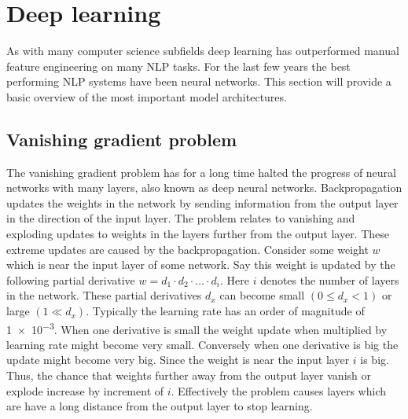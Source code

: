 \section{Deep learning}
\label{sec:deep_learning}

As with many computer science subfields deep learning has outperformed manual feature engineering on many NLP tasks.
For the last few years the best performing NLP systems have been neural networks.
This section will provide a basic overview of the most important model architectures.

\subsection{Vanishing gradient problem}
\label{subsec:vanishing_gradient_problem}
The vanishing gradient problem has for a long time halted the progress of neural networks with many layers, also known as deep neural networks.
Backpropagation updates the weights in the network by sending information from the output layer in the direction of the input layer.
The problem relates to vanishing and exploding updates to weights in the layers further from the output layer.
These extreme updates are caused by the backpropagation.
Consider some weight $w$ which is near the input layer of some network.
Say this weight is updated by the following partial derivative $w = d_1 \cdot d_2 \cdot \ldots \cdot d_i$.
Here $i$ denotes the number of layers in the network.
These partial derivatives $d_x$ can become small $(0 \leq d_x < 1)$ or large $(1 \ll d_x)$.
Typically the learning rate has an order of magnitude of \num{1e-3}.
When one derivative is small the weight update when multiplied by learning rate might become very small.
Conversely when one derivative is big the update might become very big.
Since the weight is near the input layer $i$ is big.
Thus, the chance that weights further away from the output layer vanish or explode increase by increment of $i$.
Effectively the problem causes layers which are have a long distance from the output layer to stop learning.

